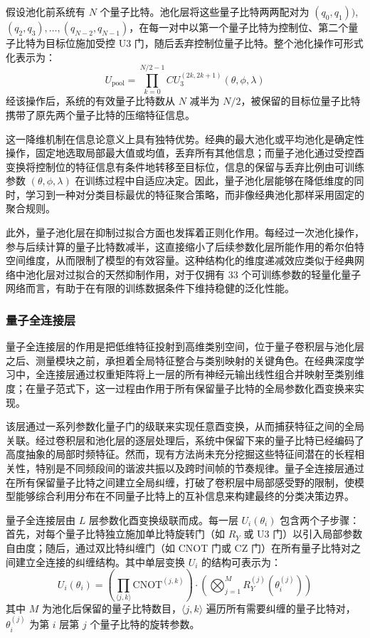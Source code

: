 假设池化前系统有 $N$ 个量子比特。池化层将这些量子比特两两配对为 $(q_0, q_1))$, $(q_2, q_3), \ldots, (q_{N-2}, q_{N-1})$，在每一对中以第一个量子比特为控制位、第二个量子比特为目标位施加受控 U3 门，随后丢弃控制位量子比特。整个池化操作可形式化表示为：
\begin{equation}
	U_{\text{pool}} = \prod_{k=0}^{N/2-1} CU_3^{(2k, 2k+1)}(\theta, \phi, \lambda)
	\label{eq:q_pool_total}
\end{equation}
经该操作后，系统的有效量子比特数从 $N$ 减半为 $N/2$，被保留的目标位量子比特携带了原先两个量子比特的压缩特征信息。

这一降维机制在信息论意义上具有独特优势。经典的最大池化或平均池化是确定性操作，固定地选取局部最大值或均值，丢弃所有其他信息；而量子池化通过受控酉变换将控制位的特征信息有条件地转移至目标位，信息的保留与丢弃比例由可训练参数 $(\theta, \phi, \lambda)$ 在训练过程中自适应决定。因此，量子池化层能够在降低维度的同时，学习到一种对分类目标最优的特征聚合策略，而非像经典池化那样采用固定的聚合规则。

此外，量子池化层在抑制过拟合方面也发挥着正则化作用。每经过一次池化操作，参与后续计算的量子比特数减半，这直接缩小了后续参数化层所能作用的希尔伯特空间维度，从而限制了模型的有效容量。这种结构化的维度递减效应类似于经典网络中池化层对过拟合的天然抑制作用，对于仅拥有 33 个可训练参数的轻量化量子网络而言，有助于在有限的训练数据条件下维持稳健的泛化性能。

\subsubsection{量子全连接层}
\label{subsec:q_fc}

量子全连接层的作用是把低维特征投射到高维类别空间，位于量子卷积层与池化层之后、测量模块之前，承担着全局特征整合与类别映射的关键角色。在经典深度学习中，全连接层通过权重矩阵将上一层的所有神经元输出线性组合并映射至类别维度；在量子范式下，这一过程由作用于所有保留量子比特的全局参数化酉变换来实现。

该层通过一系列参数化量子门的级联来实现任意酉变换，从而捕获特征之间的全局关联。经过卷积层和池化层的逐层处理后，系统中保留下来的量子比特已经编码了高度抽象的局部时频特征。然而，现有方法尚未充分挖掘这些特征间潜在的长程相关性，特别是不同频段间的谐波共振以及跨时间帧的节奏规律。量子全连接层通过在所有保留量子比特之间建立全局纠缠，打破了卷积层中局部感受野的限制，使模型能够综合利用分布在不同量子比特上的互补信息来构建最终的分类决策边界。

量子全连接层由 $L$ 层参数化酉变换级联而成。每一层 $U_i(\theta_i)$ 包含两个子步骤：首先，对每个量子比特独立施加单比特旋转门（如 $R_Y$ 或 U3 门）以引入局部参数自由度；随后，通过双比特纠缠门（如 CNOT 门或 CZ 门）在所有量子比特对之间建立全连接的纠缠结构。其中单层变换 $U_i$ 的结构可表示为：
\begin{equation}
	U_i(\theta_i) = \left(\prod_{\langle j,k \rangle} \text{CNOT}^{(j,k)}\right) \cdot \left(\bigotimes_{j=1}^{M} R_Y^{(j)}(\theta_i^{(j)})\right)
	\label{eq:q_fc_layer}
\end{equation}
其中 $M$ 为池化后保留的量子比特数目，$\langle j,k \rangle$ 遍历所有需要纠缠的量子比特对，$\theta_i^{(j)}$ 为第 $i$ 层第 $j$ 个量子比特的旋转参数。

